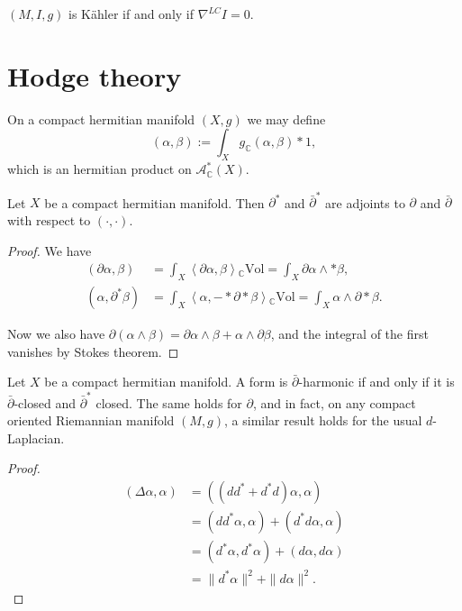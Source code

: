 \documentclass{book}
\begin{document}
\begin{exercise}
\label{exercise-kahler-iff-i-parallel}
$(M,I,g)$ is Kähler if and only if
$\nabla^{LC}I=0$.
\end{exercise}





\section{Hodge theory}
\label{section-hodge-theory}

\noindent
On a compact hermitian manifold $(X,g)$ we
may define
$$
(\alpha,\beta):=\int_Xg_{\mathbb{C}}(\alpha,
\beta)*1,
$$
which is an hermitian product on
$\mathcal{A}_{\mathbb{C}}^*(X)$.

\begin{lemma}
\label{lemma-adjoints}
\begin{reference}
\cite[Lemma 3.2.3]{huc}
\end{reference}
Let $X$ be a compact hermitian manifold.
Then $\partial^*$ and $\bar\partial^*$
are adjoints to $\partial$ and $\bar\partial$
with respect to
$(\cdot,\cdot)$.
\end{lemma}

\begin{proof}
We have
$$
\begin{aligned}
(\partial\alpha,\beta)
&=\int_X\left\langle{}\partial\alpha,
\beta\right\rangle{}_\mathbb{C}\text{Vol}
=\int_X \partial\alpha\wedge*\beta,\\
(\alpha,\partial^*\beta)
&=\int_X\left\langle{}\alpha,-
*\partial*\beta\right\rangle{}_{\mathbb{C}}\text{Vol}
=\int_X\alpha\wedge\partial*\beta.
\end{aligned}
$$

\noindent
Now we also have
$\partial(\alpha\wedge\beta)
=\partial\alpha\wedge\beta+
\alpha\wedge\partial\beta$,
and the integral of the first vanishes by
Stokes theorem.
\end{proof}

\begin{lemma}
\label{lemma-harmonic-iff-closed}
Let $X$ be a compact hermitian manifold.
A form is $\bar\partial$-harmonic if and only
if
it is $\bar\partial$-closed and
$\bar\partial^*$ closed.
The same holds for $\partial$,
and in fact, on any compact oriented
Riemannian manifold $(M,g)$,
a similar result holds for the usual
$d$-Laplacian.
\end{lemma}

\begin{proof}
$$
\begin{aligned}
(\Delta \alpha,\alpha)&=((d
d^*+d^*d)\alpha,\alpha)\\
&=(d d^*\alpha,\alpha)+(d^*d\alpha,\alpha)\\
&=(d^*\alpha,d^*\alpha)+(d\alpha,d\alpha)\\
&=\|d^*\alpha\|^2+\|d\alpha\|^2.
\end{aligned}
$$
\end{proof}
\end{document}
